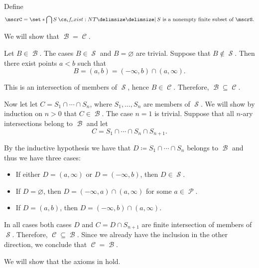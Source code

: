 \begin{defproof}
   Define
  \begin{equation*}
    \mscrC = \set*{ \bigcap S \given* S \text{ is a nonempty finite subset of } \mscrS }.
  \end{equation*}

  We will show that \( \mscrB = \mscrC \).

  Let \( B \in \mscrB \). The cases \( B \in \mscrS \) and \( B = \varnothing \) are trivial. Suppose that \( B \not\in \mscrS \). Then there exist points \( a < b \) such that
  \begin{equation*}
    B = (a, b) = (-\infty, b) \cap (a, \infty).
  \end{equation*}

  This is an intersection of members of \( \mscrS \), hence \( B \in \mscrC \). Therefore, \( \mscrB \subseteq \mscrC \).

  Now let let \( C = S_1 \cap \cdots \cap S_n \), where \( S_1, \ldots, S_n \) are members of \( \mscrS \). We will show by induction on \( n > 0 \) that \( C \in \mscrB \). The case \( n = 1 \) is trivial. Suppose that all \( n \)-ary intersections belong to \( \mscrB \) and let
  \begin{equation*}
    C = S_1 \cap \cdots \cap S_n \cap S_{n+1}.
  \end{equation*}

  By the inductive hypothesis we have that \( D \coloneqq S_1 \cap \cdots \cap S_n \) belongs to \( \mscrB \) and thus we have three cases:
  \begin{itemize}
    \item If either \( D = (a, \infty) \) or \( D = (-\infty, b) \), then \( D \in \mscrS \).
    \item If \( D = \varnothing \), then \( D = (-\infty, a) \cap (a, \infty) \) for some \( a \in \mscrP \).
    \item If \( D = (a, b) \), then \( D = (-\infty, b) \cap (a, \infty) \).
  \end{itemize}

  In all cases both cases \( D \) and \( C = D \cap S_{n+1} \) are finite intersection of members of \( \mscrS \). Therefore, \( \mscrC \subseteq \mscrB \). Since we already have the inclusion in the other direction, we conclude that \( \mscrC = \mscrB \).

   We will show that the axioms in  hold.


\end{defproof}
